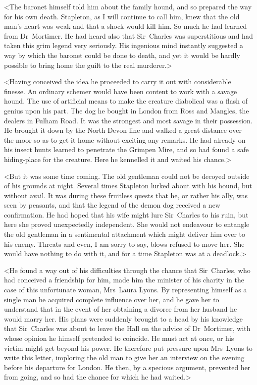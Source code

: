 <The baronet himself told him about the family hound, and so prepared the way for his own death. Stapleton, as I will continue to call him, knew that the old man's heart was weak and that a shock would kill him. So much he had learned from Dr~Mortimer. He had heard also that Sir~Charles was superstitious and had taken this grim legend very seriously. His ingenious mind instantly suggested a way by which the baronet could be done to death, and yet it would be hardly possible to bring home the guilt to the real murderer.>

<Having conceived the idea he proceeded to carry it out with considerable finesse. An ordinary schemer would have been content to work with a savage hound. The use of artificial means to make the creature diabolical was a flash of genius upon his part. The dog he bought in London from Ross and Mangles, the dealers in Fulham Road. It was the strongest and most savage in their possession. He brought it down by the North Devon line and walked a great distance over the moor so as to get it home without exciting any remarks. He had already on his insect hunts learned to penetrate the Grimpen Mire, and so had found a safe hiding-place for the creature. Here he kennelled it and waited his chance.>

<But it was some time coming. The old gentleman could not be decoyed outside of his grounds at night. Several times Stapleton lurked about with his hound, but without avail. It was during these fruitless quests that he, or rather his ally, was seen by peasants, and that the legend of the demon dog received a new confirmation. He had hoped that his wife might lure Sir~Charles to his ruin, but here she proved unexpectedly independent. She would not endeavour to entangle the old gentleman in a sentimental attachment which might deliver him over to his enemy. Threats and even, I am sorry to say, blows refused to move her. She would have nothing to do with it, and for a time Stapleton was at a deadlock.>

<He found a way out of his difficulties through the chance that Sir~Charles, who had conceived a friendship for him, made him the minister of his charity in the case of this unfortunate woman, Mrs~Laura Lyons. By representing himself as a single man he acquired complete influence over her, and he gave her to understand that in the event of her obtaining a divorce from her husband he would marry her. His plans were suddenly brought to a head by his knowledge that Sir~Charles was about to leave the Hall on the advice of Dr~Mortimer, with whose opinion he himself pretended to coincide. He must act at once, or his victim might get beyond his power. He therefore put pressure upon Mrs~Lyons to write this letter, imploring the old man to give her an interview on the evening before his departure for London. He then, by a specious argument, prevented her from going, and so had the chance for which he had waited.>

